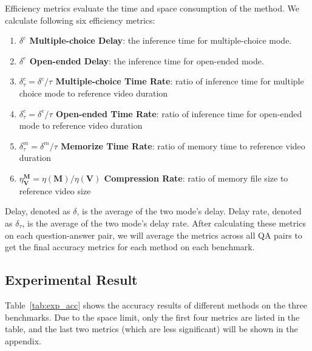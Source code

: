 Efficiency metrics evaluate the time and space consumption of the method. We calculate following six efficiency metrics:
\begin{enumerate}
    \item \textbf{$\delta^c$ Multiple-choice Delay}: the inference time for multiple-choice mode.
    \item \textbf{$\delta^e$ Open-ended Delay}: the inference time for open-ended mode.
    \item \textbf{$\delta^c_\tau=\delta^c/\tau$ Multiple-choice Time Rate}: ratio of inference time for multiple choice mode to reference video duration
    \item \textbf{$\delta^e_\tau=\delta^e/\tau$ Open-ended Time Rate}: ratio of inference time for open-ended mode to reference video duration
    \item \textbf{$\delta^m_\tau=\delta^m/\tau$ Memorize Time Rate}: ratio of memory time to reference video duration
    \item \textbf{$\eta^{\mathbf{M}}_{\mathbf{V}}=\eta(\mathbf{M})/\eta(\mathbf{V})$ Compression Rate}: ratio of memory file size to reference video size
\end{enumerate}
Delay, denoted as $\delta$, is the average of the two mode's delay. Delay rate, denoted as $\delta_\tau$, is the average of the two mode's delay rate.
After calculating these metrics on each question-answer pair, we will average the metrics across all QA pairs to get the final accuracy metrics for each method on each benchmark.







\subsection{Experimental Result}\label{sub:exp_result}


Table~\ref{tab:exp_acc} shows the accuracy results of different methods on the three benchmarks. Due to the space limit, only the first four metrics are listed in the table, and the last two metrics (which are less significant) will be shown in the appendix.

